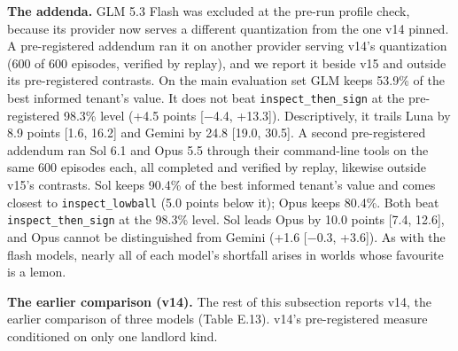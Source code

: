 \textbf{The addenda.} GLM 5.3 Flash was excluded at the pre-run profile check, because its provider now serves a different
quantization from the one v14 pinned. A pre-registered addendum ran it on another provider serving v14's quantization
(600 of 600 episodes, verified by replay), and we report it beside v15 and outside its pre-registered contrasts. On
the main evaluation set GLM keeps 53.9\% of the best informed tenant's value. It does not beat \texttt{inspect\_\allowbreak{}then\_\allowbreak{}sign} at
the pre-registered 98.3\% level (+4.5 points {[}−4.4, +13.3{]}). Descriptively, it trails Luna by 8.9 points {[}1.6, 16.2{]}
and Gemini by 24.8 {[}19.0, 30.5{]}. A second pre-registered addendum ran Sol 6.1 and Opus 5.5 through their command-line
tools on the same 600 episodes each, all completed and verified by replay, likewise outside v15's contrasts. Sol keeps
90.4\% of the best informed tenant's value and comes closest to \texttt{inspect\_\allowbreak{}lowball} (5.0 points below it); Opus keeps
80.4\%. Both beat \texttt{inspect\_\allowbreak{}then\_\allowbreak{}sign} at the 98.3\% level. Sol leads Opus by 10.0 points {[}7.4, 12.6{]}, and Opus cannot be
distinguished from Gemini (+1.6 {[}−0.3, +3.6{]}). As with the flash models, nearly all of each model's shortfall arises
in worlds whose favourite is a lemon.

\textbf{The earlier comparison (v14).} The rest of this subsection reports v14, the earlier comparison of three models
(Table E.13). v14's pre-registered measure conditioned on only one landlord kind.

